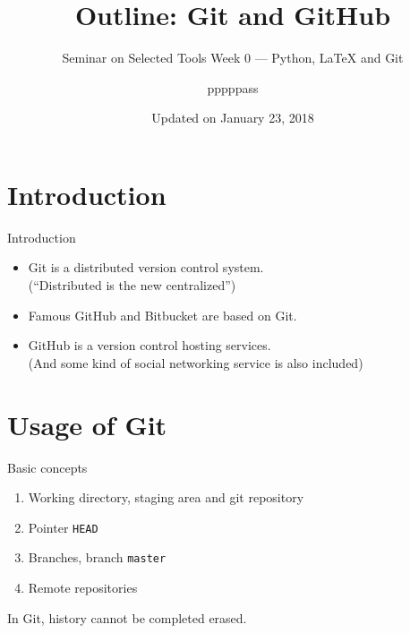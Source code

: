 \documentclass[english, nochinese]{../TeXTemplate/pkuslide}
\title{Outline: Git and GitHub}
\subtitle{Seminar on Selected Tools Week 0 --- Python, \texorpdfstring{\LaTeX}{LaTeX} and Git}
\author{pppppass}
\date{Updated on January 23, 2018}
\begin{document}
\begin{frame}
\titlepage
\end{frame}

\begin{frame}
\tableofcontents[subsectionstyle=show]
\end{frame}

\section{Introduction}

\begin{frame}
\sectionpage
\end{frame}

\begin{frame}{Introduction}
\begin{itemize}
\item Git is a distributed version control system. \\
(``Distributed is the new centralized'')
\item Famous GitHub and Bitbucket are based on Git.
\item GitHub is a version control hosting services. \\
(And some kind of social networking service is also included)
\end{itemize}
\end{frame}

\section{Usage of Git}

\begin{frame}
\sectionpage
\end{frame}

\begin{frame}[fragile]{Basic concepts}
\begin{enumerate}
\item Working directory, staging area and git repository
\item Pointer \verb"HEAD"
\item Branches, branch \verb"master"
\item Remote repositories
\end{enumerate}
In Git, history \alert{cannot} be completed erased.
\end{frame}
\end{document}
